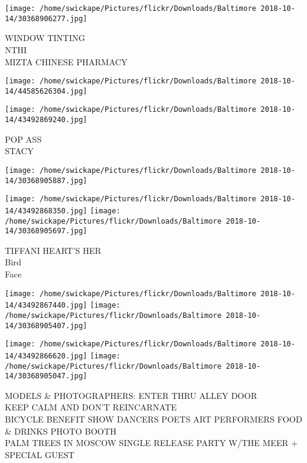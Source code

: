 \documentclass[10pt,letterpaper]{article}
\begin{document}
\vspace{0.25in}
\texttt{[image: /home/swickape/Pictures/flickr/Downloads/Baltimore 2018-10-14/30368906277.jpg]}

WINDOW TINTING\\
NTHI\\
MIZTA CHINESE PHARMACY\\
\pagebreak

\texttt{[image: /home/swickape/Pictures/flickr/Downloads/Baltimore 2018-10-14/44585626304.jpg]}

\vspace{0.25in}
\texttt{[image: /home/swickape/Pictures/flickr/Downloads/Baltimore 2018-10-14/43492869240.jpg]}

POP ASS\\
STACY\\
\pagebreak

\texttt{[image: /home/swickape/Pictures/flickr/Downloads/Baltimore 2018-10-14/30368905887.jpg]}

\vspace{0.25in}
\texttt{[image: /home/swickape/Pictures/flickr/Downloads/Baltimore 2018-10-14/43492868350.jpg]}
\texttt{[image: /home/swickape/Pictures/flickr/Downloads/Baltimore 2018-10-14/30368905697.jpg]}

TIFFANI HEART'S HER\\
Bird\\
Face\\
\pagebreak

\texttt{[image: /home/swickape/Pictures/flickr/Downloads/Baltimore 2018-10-14/43492867440.jpg]}
\texttt{[image: /home/swickape/Pictures/flickr/Downloads/Baltimore 2018-10-14/30368905407.jpg]}

\texttt{[image: /home/swickape/Pictures/flickr/Downloads/Baltimore 2018-10-14/43492866620.jpg]}
\texttt{[image: /home/swickape/Pictures/flickr/Downloads/Baltimore 2018-10-14/30368905047.jpg]}

MODELS \& PHOTOGRAPHERS: ENTER THRU ALLEY DOOR\\
KEEP CALM AND DON'T REINCARNATE\\
BICYCLE BENEFIT SHOW DANCERS POETS ART PERFORMERS FOOD \& DRINKS PHOTO BOOTH\\
PALM TREES IN MOSCOW SINGLE RELEASE PARTY W/THE MEER + SPECIAL GUEST\\
\pagebreak
\end{document}
